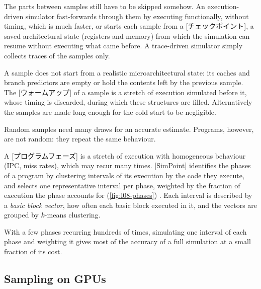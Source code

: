 \documentclass[../main.tex]{subfiles}
\begin{document}
The parts between samples still have to be skipped somehow.  An
execution-driven simulator fast-forwards through them by executing
functionally, without timing, which is much faster, or starts each
sample from a [チェックポイント], a saved
architectural state (registers and memory) from which the simulation
can resume without executing what came before.  A trace-driven
simulator simply collects traces of the samples only.

A sample does not start from a realistic microarchitectural state:
its caches and branch predictors are empty or hold the contents left
by the previous sample.  The [ウォームアップ] of a sample
is a stretch of execution simulated before it, whose timing is
discarded, during which these structures are filled.  Alternatively
the samples are made long enough for the cold start to be negligible.

Random samples need many draws for an accurate estimate.  Programs,
however, are not random: they repeat the same behaviour.

\begin{definition}
  \label{def:l08-phase}
  A [プログラムフェーズ] is a stretch of execution
  with homogeneous behaviour (IPC, miss rates), which may recur many
  times.  [SimPoint] identifies the phases of a
  program by clustering intervals of its execution by the code they
  execute, and selects one representative interval per phase, weighted
  by the fraction of execution the phase accounts for
  (\cref{fig:l08-phases}) \cite{sherwood2002simpoint}.  Each interval
  is described by a \emph{basic block vector}, how often each basic
  block executed in it, and the vectors are grouped by $k$-means
  clustering.
\end{definition}

\begin{marginfigure}
  \resizebox{\linewidth}{!}{}
  \caption{IPC over time of a program alternating a high-IPC phase A
    and a low-IPC phase B.  Phase-based sampling simulates one
    representative of each (outlined).}
  \label{fig:l08-phases}
\end{marginfigure}

With a few phases recurring hundreds of times, simulating one interval
of each phase and weighting it gives most of the accuracy of a full
simulation at a small fraction of its cost.

\subsection{Sampling on GPUs}
\end{document}

